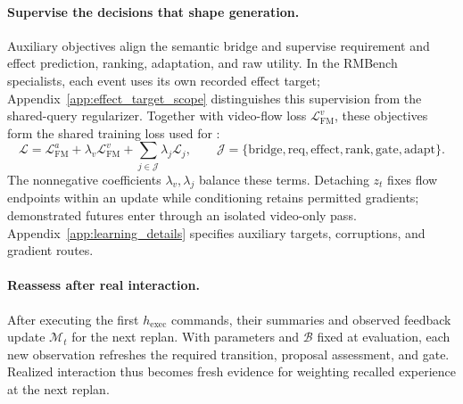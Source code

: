 \paragraph{Supervise the decisions that shape generation.}
Auxiliary objectives align the semantic bridge and supervise requirement and effect prediction, ranking, adaptation, and raw utility.
In the RMBench specialists, each event uses its own recorded effect target; Appendix~\ref{app:effect_target_scope} distinguishes this supervision from the shared-query regularizer.
Together with video-flow loss $\mathcal L_{\mathrm{FM}}^v$, these objectives form the shared training loss used for \method{}:
\begin{equation}
 \mathcal L=\mathcal L_{\mathrm{FM}}^a+\lambda_v\mathcal L_{\mathrm{FM}}^v+
 \sum_{j\in\mathcal J}\lambda_j\mathcal L_j,\qquad
 \mathcal J=\{\mathrm{bridge},\mathrm{req},\mathrm{effect},\mathrm{rank},\mathrm{gate},\mathrm{adapt}\}.
 \label{eq:loss}
\end{equation}
The nonnegative coefficients $\lambda_v,\lambda_j$ balance these terms. Detaching $z_t$ fixes flow endpoints within an update while conditioning retains permitted gradients; demonstrated futures enter through an isolated video-only pass.
Appendix~\ref{app:learning_details} specifies auxiliary targets, corruptions, and gradient routes.

\paragraph{Reassess after real interaction.}
After executing the first $h_{\mathrm{exec}}$ commands, their summaries and observed feedback update $\mathcal M_t$ for the next replan.
With parameters and $\mathcal B$ fixed at evaluation, each new observation refreshes the required transition, proposal assessment, and gate.
Realized interaction thus becomes fresh evidence for weighting recalled experience at the next replan.
